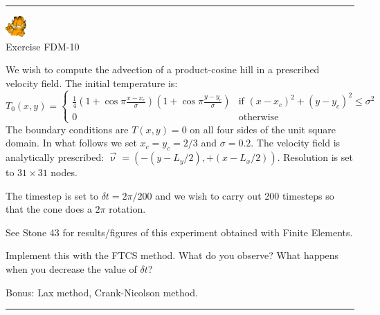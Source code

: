 \begin{center}
\begin{minipage}[t]{0.77\textwidth}
\par\noindent\rule{\textwidth}{0.4pt}
\begin{center}
\includegraphics[width=0.8cm]{images/garftr} \\
{\color{orange} Exercise FDM-10}
\end{center}

We wish to compute the advection of a product-cosine hill
in a prescribed velocity field. The initial temperature is:
\[
T_0(x,y)=
\left\{
\begin{array}{cc}
\frac{1}{4}
\left(1+\cos \pi\frac{x-x_c}{\sigma}\right)
\left(1+\cos \pi\frac{y-y_c}{\sigma}\right)
& \text{if } (x-x_c)^2+(y-y_c)^2\leq \sigma^2 \\
0 & \text{otherwise}
\end{array} 
\right.
\]
The boundary conditions are $T(x,y)=0$ on all four sides of the unit square domain. 
In what follows we set $x_c=y_c=2/3$ and $\sigma=0.2$.  
The velocity field is analytically prescribed: $\vec\upnu=(-(y-L_y/2),+(x-L_x/2))$.
Resolution is set to $31\times31$ nodes.

The timestep is set to $\delta t=2\pi/200$ and we wish to carry out 200
timesteps so that the cone does a $2\pi$ rotation.

See Stone 43 for results/figures of this experiment obtained 
with Finite Elements.

Implement this with the FTCS method. What do you observe? What happens when you decrease 
the value of $\delta t$? 

Bonus: Lax method, Crank-Nicolson method.

\par\noindent\rule{\textwidth}{0.4pt}
\end{minipage}
\end{center}

\vspace{1cm}

